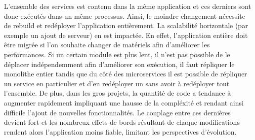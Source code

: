 	L'ensemble des services est contenu dans la même application et ces derniers sont donc exécutés dans un même processus. Ainsi, le moindre changement nécessite de rebuild et redéployer l'application entièrement. La scalabilité horizontale (par exemple un ajout de serveur) en est impactée. En effet, l'application entière doit être migrée si l'on souhaite changer de matériels afin d'améliorer les performances. Si un certain module est plus lent, il n'est pas possible de le déplacer indépendemment afin d'améliorer son exécution, il faut répliquer le monolithe entier tandis que du côté des microservices il est possible de répliquer un service en particulier et d'en redéployer un sans avoir à redéployer tout l'ensemble. De plus, dans les gros projets, la quantité de code a tendance à augmenter rapidement impliquant une hausse de la compléxité et rendant ainsi difficile l'ajout de nouvelles fonctionnalités. Le couplage entre ces dernières devient fort et les nombreux effets de bords résultant de chaque modifications rendent alors l'application moins fiable, limitant les perspectives d'évolution.


